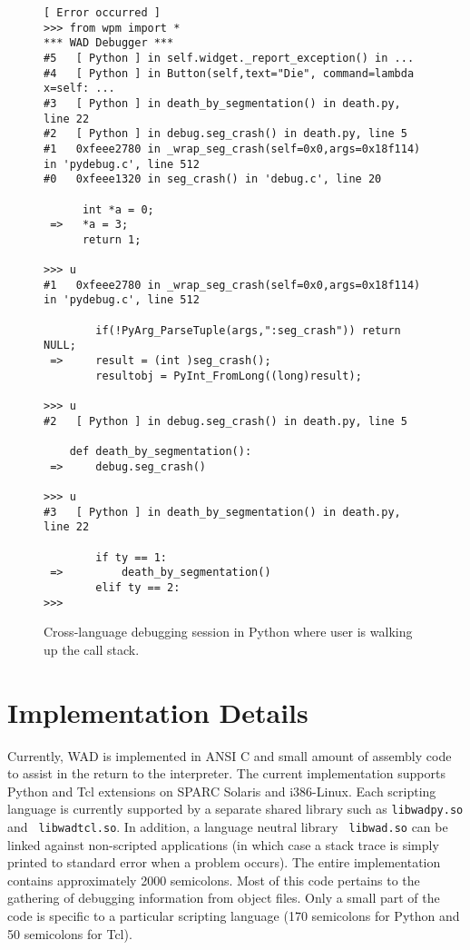 \begin{figure*}[t]
{\small
\begin{verbatim}
[ Error occurred ]
>>> from wpm import *
*** WAD Debugger ***
#5   [ Python ] in self.widget._report_exception() in ...
#4   [ Python ] in Button(self,text="Die", command=lambda x=self: ...
#3   [ Python ] in death_by_segmentation() in death.py, line 22
#2   [ Python ] in debug.seg_crash() in death.py, line 5
#1   0xfeee2780 in _wrap_seg_crash(self=0x0,args=0x18f114) in 'pydebug.c', line 512
#0   0xfeee1320 in seg_crash() in 'debug.c', line 20

      int *a = 0;
 =>   *a = 3;
      return 1;

>>> u
#1   0xfeee2780 in _wrap_seg_crash(self=0x0,args=0x18f114) in 'pydebug.c', line 512
        
        if(!PyArg_ParseTuple(args,":seg_crash")) return NULL;
 =>     result = (int )seg_crash();
        resultobj = PyInt_FromLong((long)result);

>>> u
#2   [ Python ] in debug.seg_crash() in death.py, line 5
    
    def death_by_segmentation():
 =>     debug.seg_crash()
    
>>> u
#3   [ Python ] in death_by_segmentation() in death.py, line 22

        if ty == 1:
 =>         death_by_segmentation()
        elif ty == 2:
>>> \end{verbatim}
}
\caption{Cross-language debugging session in Python where user is walking up the call stack.}
\end{figure*}

\section{Implementation Details}

Currently, WAD is implemented in ANSI C and small amount of assembly
code to assist in the return to the interpreter.  The current
implementation supports Python and Tcl extensions on SPARC Solaris and
i386-Linux.  Each scripting language is currently supported by a
separate shared library such as {\tt libwadpy.so} and {\tt
libwadtcl.so}.  In addition, a language neutral library {\tt
libwad.so} can be linked against non-scripted applications (in which case
a stack trace is simply printed to standard error when a problem occurs). 
The entire implementation contains approximately 2000
semicolons. Most of this code pertains to the gathering of debugging
information from object files.  Only a small part of the code is
specific to a particular scripting language (170 semicolons for Python
and 50 semicolons for Tcl).

